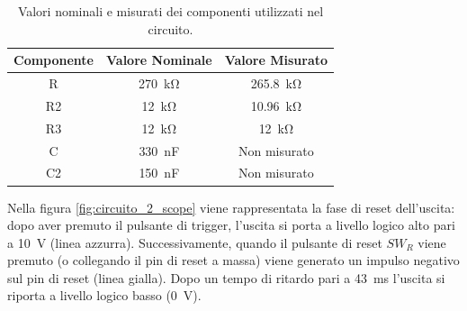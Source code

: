 \def\arraystretch{1.3}
\begin{table}[h!]
	\centering
	\begin{tabular}{|c|c|c|}
		\hline
		Componente	& Valore Nominale & Valore Misurato \\ \hline
		R &\SI{270}{\kilo\ohm} & \SI{265,8}{\kilo\ohm} \\ \hline
		R2 &\SI{12}{\kilo\ohm} & \SI{10,96}{\kilo\ohm} \\ \hline
		R3 & \SI{12}{\kilo\ohm} & \SI{12}{\kilo\ohm} \\ \hline
		C & \SI{330}{\nano\farad} & Non misurato \\ \hline
		C2 & \SI{150}{\nano\farad} & Non misurato \\ \hline
	\end{tabular}
	\caption{Valori nominali e misurati dei componenti utilizzati nel circuito.}
	\label{tab:valori_componenti_2}
\end{table}
Nella figura \ref{fig:circuito_2_scope} viene rappresentata la fase di reset dell'uscita: dopo aver premuto il pulsante di trigger, l'uscita si porta a livello logico alto pari a \SI{10}{\volt} (linea azzurra). Successivamente, quando il pulsante di reset $SW_R$ viene premuto (o collegando il pin di reset a massa) viene generato un impulso negativo sul pin di reset (linea gialla). Dopo un tempo di ritardo pari a \SI{43}{\milli\second} l'uscita si riporta a livello logico basso (\SI{0}{\volt}).
